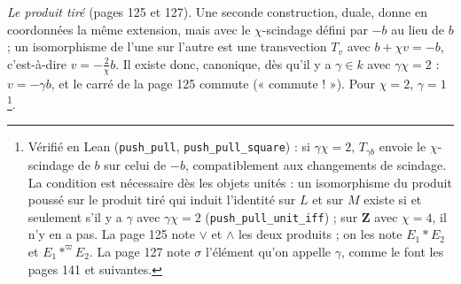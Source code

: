 \documentclass[11pt,a4paper]{article}
\begin{document}
\emph{Le produit tiré} (pages 125 et 127). Une seconde construction, duale, donne
en coordonnées la même extension, mais avec le $\chi$-scindage défini par $-b$ au
lieu de $b$ ; un isomorphisme de l'une sur l'autre est une transvection $T_v$ avec
$b + \chi v = -b$, c'est-à-dire $v = -\tfrac{2}{\chi}b$. Il existe donc, canonique,
dès qu'il y a $\gamma \in k$ avec $\gamma\chi = 2$ : $v = -\gamma b$, et le carré de la page
125 commute (« commute ! »). Pour $\chi = 2$, $\gamma = 1$\footnote{Vérifié en Lean
(\texttt{push\_pull}, \texttt{push\_pull\_square}) : si $\gamma\chi = 2$, $T_{\gamma b}$
envoie le $\chi$-scindage de $b$ sur celui de $-b$, compatiblement aux changements
de scindage. La condition est nécessaire dès les objets unités : un isomorphisme
du produit poussé sur le produit tiré qui induit l'identité sur $L$ et sur $M$
existe si et seulement s'il y a $\gamma$ avec $\gamma\chi = 2$
(\texttt{push\_pull\_unit\_iff}) ; sur $\mathbf{Z}$ avec $\chi = 4$, il n'y en a
pas. La page 125 note
$\vee$ et $\wedge$ les deux produits ; on les note $E_1 * E_2$ et $E_1 *^{\varpi} E_2$. La
page 127 note $\sigma$ l'élément qu'on appelle $\gamma$, comme le font les pages 141 et
suivantes.}.

\begin{center}
\end{center}
\end{document}
